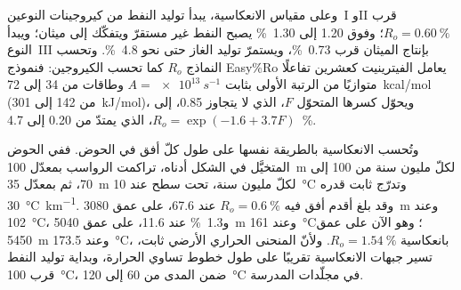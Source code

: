 وعلى مقياس الانعكاسية، يبدأ توليد النفط من كيروجينات النوعين~I وII قرب $R_o =
\qty{0.60}{\percent}$؛ وفوق 1.20 إلى \qty{1.30}{\percent} يصبح النفط غير مستقرّ ويتفكّك إلى
ميثان؛ ويبدأ النوع~III بإنتاج الميثان قرب \qty{0.73}{\percent}، ويستمرّ توليد الغاز حتى
نحو \qty{4.8}{\percent}. وتحسب النماذج $R_o$ كما تحسب الكيروجين: فنموذج Easy\%Ro
يعامل الفيترينيت كعشرين تفاعلًا متوازيًا من الرتبة الأولى بثابت $A = \qty{e13}{s^{-1}}$ وطاقات
من 34 إلى \qty{72}{kcal/mol} (من 142 إلى \qty{301}{kJ/mol})، ويحوّل كسرها المتحوّل $F$،
الذي لا يتجاوز 0.85، إلى $R_o = \exp(-1.6 + 3.7F)$، الذي يمتدّ من 0.20 إلى \qty{4.7}{\percent}.

وتُحسب الانعكاسية بالطريقة نفسها على طول كلّ أفق في الحوض. ففي الحوض المتخيَّل في
الشكل أدناه، تراكمت الرواسب بمعدّل \qty{100}{m} لكلّ مليون سنة من 100 إلى \qty{70}{\Ma}،
ثم بمعدّل \qty{35}{m} لكلّ مليون سنة، تحت سطح عند \qty{10}{\celsius} وتدرّج ثابت
قدره \qty{30}{\celsius\per\km}. وقد بلغ أقدم أفق فيه $R_o = \qty{0.6}{\percent}$ عند
\qty{67.6}{\Ma}، على عمق \qty{3080}{m} وعند \qty{102}{\celsius}، و\qty{1.3}{\percent} عند
\qty{11.6}{\Ma}، على عمق \qty{5040}{m} وعند \qty{161}{\celsius}؛ وهو الآن على عمق \qty{5450}{m} وعند
\qty{173.5}{\celsius}، بانعكاسية $R_o = \qty{1.54}{\percent}$. ولأنّ المنحنى الحراري الأرضي ثابت، تسير
جبهات الانعكاسية تقريبًا على طول خطوط تساوي الحرارة، وبداية توليد النفط قرب
\qty{100}{\celsius}، ضمن المدى من 60 إلى \qty{120}{\celsius} في مجلّدات المدرسة.

